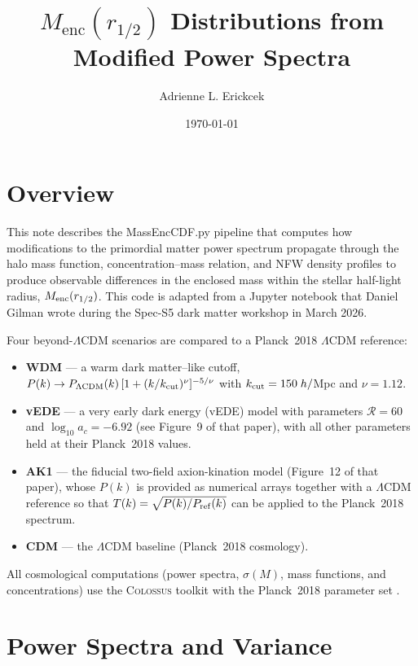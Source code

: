 \documentclass[11pt]{article}
\title{$M_\mathrm{enc}(r_{1/2})$ Distributions from Modified Power Spectra}
\author{Adrienne L. Erickcek}
\date{\today}
\newcommand{\lcdm}{\Lambda\text{CDM}}
\begin{document}
\maketitle

\section{Overview}

This note describes the MassEncCDF.py pipeline that computes how modifications to the
primordial matter power spectrum propagate through the halo mass function,
concentration--mass relation, and NFW density profiles to produce
observable differences in the enclosed mass within the stellar half-light
radius, $M_{\rm enc}(r_{1/2})$.  This code is adapted from a Jupyter notebook that Daniel Gilman wrote during the Spec-S5 dark matter workshop in March 2026. 

Four beyond-$\lcdm$ scenarios are
compared to a Planck~2018 $\lcdm$ reference:

\begin{itemize}
  \item \textbf{WDM} --- a warm dark matter--like cutoff,
        $P(k)\to P_{\lcdm}(k)\,[1+(k/k_{\rm cut})^\nu]^{-5/\nu}$
        with $k_{\rm cut}=150\;h/$Mpc and $\nu=1.12$.
  \item \textbf{vEDE} --- a very early dark energy (vEDE) model \cite{vEDE}
        with parameters $\mathcal{R}=60$ and $\log_{10}a_c=-6.92$
        (see Figure~9 of that paper), with all other parameters held at
        their Planck~2018 values.
  \item \textbf{AK1} --- the fiducial two-field axion-kination model
        \cite{AK1} (Figure~12 of that paper), whose $P(k)$ is provided
        as numerical arrays together with a $\lcdm$ reference so that
        $T(k)=\sqrt{P(k)/P_{\rm ref}(k)}$ can be applied to the
        Planck~2018 spectrum.
  \item \textbf{CDM} --- the $\lcdm$ baseline (Planck~2018 cosmology).
\end{itemize}

All cosmological computations (power spectra, $\sigma(M)$, mass
functions, and concentrations) use the \textsc{Colossus} toolkit with the
Planck~2018 parameter set \cite{Diemer:2017bwl}.

\section{Power Spectra and Variance}
\end{document}
